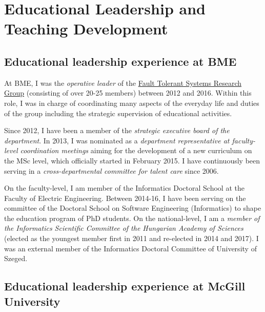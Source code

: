 \documentclass[a4paper,11pt]{report}
\begin{document}
\section{Educational Leadership and Teaching Development}


\subsection{Educational leadership experience at BME}
At BME, I was the \emph{operative leader} of the \href{http://inf.mit.bme.hu/en/}{Fault Tolerant Systems Research Group} (consisting of over 20-25 members) between 2012 and 2016. Within this role, I was in charge of coordinating many aspects of the everyday life and duties of the group including the strategic supervision of educational activities. 

Since 2012, I have been a member of the \emph{strategic executive board of the department}. In 2013, I was nominated as a \emph{department representative at faculty-level coordination meetings} aiming for the development of a new curriculum on the MSc level, which officially started in February 2015. I have continuously been serving in a \emph{cross-departmental committee for talent care} since 2006. 

On the faculty-level, I am member of the Informatics Doctoral School at the Faculty of Electric Engineering. Between 2014-16, I have been serving on the committee of the Doctoral School on Software Engineering (Informatics) to shape the education program of PhD students. On the national-level, I am a \emph{member of the Informatics Scientific Committee of the Hungarian Academy of Sciences} (elected as the youngest member first in 2011 and re-elected in 2014 and 2017). I was an external member of the Informatics Doctoral Committee of University of Szeged.

\subsection{Educational leadership experience at McGill University}

\end{document}
